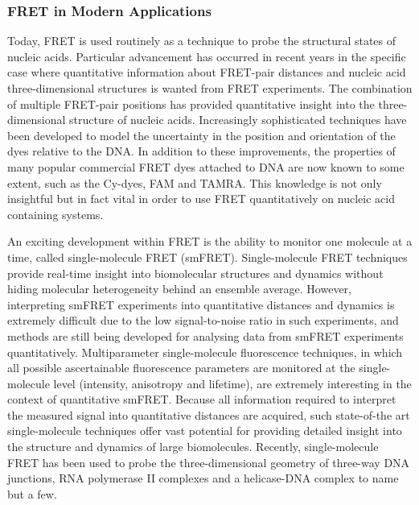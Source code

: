 \subsubsection{FRET in Modern Applications}
 Today, FRET is used routinely as a technique to probe the structural states of nucleic acids. Particular advancement has occurred in recent years in the specific case where quantitative information about FRET-pair distances and nucleic acid three-dimensional structures is wanted from FRET experiments. The combination of multiple FRET-pair positions has provided quantitative insight into the three-dimensional structure of nucleic acids.\cite{Muschielok2008,Muschielok2011,Sabir2011,Sabir2012,Wozniak2008,Andrecka2008,Andrecka2009,Balci2011} Increasingly sophisticated techniques have been developed to model the uncertainty in the position and orientation of the dyes relative to the DNA.\cite{Muschielok2008,Sindbert2011,Rindermann2011} In addition to these improvements, the properties of many popular commercial FRET dyes attached to DNA are now known to some extent, such as the Cy-dyes\cite{Levitus2011,Norman2000,Sanborn2007,Iqbal2008a,Harvey2009,Harvey2009a}, FAM\cite{Noble2005,Unruh2005,Unruh2005a,Wang2004} and TAMRA\cite{Unruh2005,Unruh2005a,Wang2004,Vamosi1996,Stennett2012}. This knowledge is not only insightful but in fact vital in order to use FRET quantitatively on nucleic acid containing systems.

 An exciting development within FRET is the ability to monitor one molecule at a time, called single-molecule FRET (smFRET).\cite{Mollova2002,McKinney2004,Selvin2008,Roy2008,Joo2008} Single-molecule FRET techniques provide real-time insight into biomolecular structures and dynamics without hiding molecular heterogeneity behind an ensemble average. However, interpreting smFRET experiments into quantitative distances and dynamics is extremely difficult due to the low signal-to-noise ratio in such experiments, and methods are still being developed for analysing data from smFRET experiments quantitatively.\cite{Watkins2006,Gopich2005,Gopich2007,Gopich2009,Nir2006,Antonik2006,Kalinin2008,Kalinin2010} Multiparameter single-molecule fluorescence techniques, in which all possible ascertainable fluorescence parameters are monitored at the single-molecule level (intensity, anisotropy and lifetime), are extremely interesting in the context of quantitative smFRET.\cite{Sisamakis2010,Kuhnemuth2001,Kudryavtsev2012,Eggeling2006,Widengren2006,Laurence2005,Muller2005} Because all information required to interpret the measured signal into quantitative distances are acquired, such state-of-the art single-molecule techniques offer vast potential for providing detailed insight into the structure and dynamics of large biomolecules. Recently, single-molecule FRET has been used to probe the three-dimensional geometry of three-way DNA junctions\cite{Sabir2011,Sabir2012}, RNA polymerase II complexes\cite{Andrecka2008,Andrecka2009,Treutlein2012} and a helicase-DNA complex\cite{Balci2011} to name but a few.

